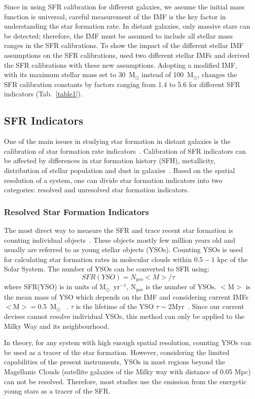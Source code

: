 Since in using SFR calibration for different galaxies, we assume the initial mass function is universal, careful measurement of the IMF is the key factor in understanding the star formation rate. 
In distant galaxies, only massive stars can be detected; therefore, the IMF must be assumed to include all stellar mass ranges in the SFR calibrations. 
To show the impact of the different stellar IMF assumptions on the SFR calibrations, \cite{Calzetti13} used two different stellar IMFs and derived the SFR calibrations with these new assumptions.
Adopting a modified \cite{Kroupa01} IMF, with its maximum stellar mass set to 30~M$_{\odot}$ instead of 100~M$_{\odot}$, changes the SFR calibration constants by factors ranging from 1.4 to 5.6 for different SFR indicators (Tab.~\ref{table1}). 

\subsection{SFR Indicators}

One of the main issues in studying star formation in distant galaxies is the calibration of star formation rate indicators~\citep[e.g.,][]{Lee10}. 
Calibration of SFR indicators can be affected by differences in star formation history (SFH), metallicity, distribution of stellar population and dust in galaxies~\citep{Calzetti13}. 
Based on the spatial resolution of a system, one can divide star formation indicators into two categories: resolved and unresolved star formation indicators.

\subsubsection{Resolved Star Formation Indicators}
The most direct way to measure the SFR and trace recent star formation is counting individual objects~\citep{Kennicutt12}. 
These objects mostly few million years old and usually are referred to as young stellar objects (YSOs). 
Counting YSOs is used for calculating star formation rates in molecular clouds within $0.5- 1$ kpc of the Solar System. 
The number of YSOs can be converted to SFR using: 
\begin{equation}
SFR(YSO) = N_{yso} <M>/\tau 
\end{equation}
where SFR(YSO) is in units of M$_{\odot}$~yr$^{-1}$, N$_{yso}$ is the number of YSOs.
$<$M$>$ is the mean mass of YSO which depends on the IMF and considering current IMFs $<$M$> = $0.5~M$_{\odot}$ ~\citep[][]{Kennicutt12}. 
$\tau$ is the lifetime of the YSO  $\tau \sim 2$Myr~\citep{Evans09}. 
Since our current devises cannot resolve individual YSOs, this method can only be applied to the Milky Way and its neighbourhood. 

In theory, for any system with high enough spatial resolution, counting YSOs can be used as a tracer of the star formation. 
However, considering the limited capabilities of the present instruments, YSOs in most regions beyond the Magellanic Clouds (satellite galaxies of the Milky way with distance of 0.05 Mpc) can not be resolved. 
Therefore, most studies use the emission from the energetic young stars as a tracer of the SFR. 

